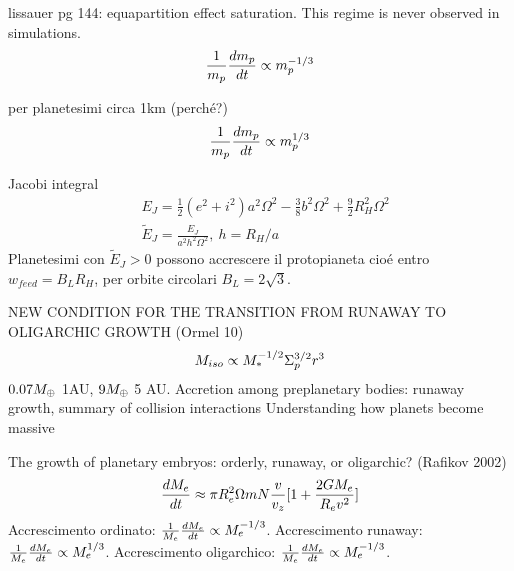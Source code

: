 \begin{workout}
lissauer pg 144: equapartition effect saturation. This regime is never observed in simulations.
\begin{equation}
\frac{1}{m_p}\TDy{t}{m_p}\propto m_p\expy{-1/3}
\end{equation}
\end{workout}

\begin{workout}
per planetesimi circa 1km (perch\'e?)
\begin{equation}
\frac{1}{m_p}\TDy{t}{m_p}\propto m_p\expy{1/3}
\end{equation}
\end{workout}

\begin{workout}
Jacobi integral
\begin{align}
&E_J=\frac{1}{2}(e^2+i^2)a^2\Omega^2-\frac{3}{8}b^2\Omega^2+\frac{9}{2}R_H^2\Omega^2\\
&\tilde{E}_J=\frac{E_J}{a^2h^2\Omega^2},\ h=R_H/a
\end{align}
Planetesimi con $\tilde{E}_J>0$ possono accrescere il protopianeta  cio\'e entro $w_{feed}=B_LR_H$, per orbite circolari $B_L=2\sqrt{3 }$.
\end{workout}

\begin{workout}
 NEW CONDITION FOR THE TRANSITION FROM RUNAWAY TO OLIGARCHIC GROWTH (Ormel 10)
 \begin{equation}
M_{iso}\propto M_*\expy{-1/2}\Sigma_p\expy{3/2}r^3
\end{equation}
$0.07\mearth{}$ 1AU, $9\mearth{}$ 5 AU.
Accretion among preplanetary bodies: runaway growth, summary of collision interactions
Understanding how planets become massive
\end{workout}
  
\begin{workout}
The growth of planetary embryos:  orderly, runaway, or oligarchic? (Rafikov 2002)
\begin{align}
\TDy{t}{M_e}\approx\pi R_e^2\Omega mN\frac{v}{v_z}[1+\frac{2GM_e}{R_ev^2}]
\end{align}
Accrescimento ordinato: $\frac{1}{M_e}\TDy{t}{M_e}\propto M_e\expy{-1/3}$. Accrescimento runaway: $\frac{1}{M_e}\TDy{t}{M_e}\propto M_e\expy{1/3}$. Accrescimento oligarchico: $\frac{1}{M_e}\TDy{t}{M_e}\propto M_e\expy{-1/3}$.
\end{workout}

